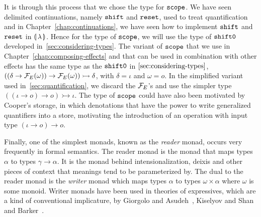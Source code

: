 It is through this process that we chose the type for $\mathtt{scope}$. We have
seen delimited continuations, namely $\mathtt{shift}$ and $\mathtt{reset}$, used to treat
quantification~\cite{shan2004delimited,shan2005linguistic} and in
Chapter~\ref{chap:continuations}, we have seen how to implement $\mathtt{shift}$
and $\mathtt{reset}$ in $\llparenthesis \, \lambda \, \rrparenthesis$. Hence for the type of $\mathtt{scope}$, we
will use the type of $\mathtt{shift0}$ developed
in~\ref{sec:considering-types}. The variant of $\mathtt{scope}$ that we use in
Chapter~\ref{chap:composing-effects} and that can be used in combination
with other effects has the same type as the $\mathtt{shift0}$ in
$\ref{sec:considering-types}$,
$((\delta \to \mathcal{F}_E(\omega)) \to \mathcal{F}_E(\omega)) \rightarrowtail \delta$,
with $\delta = \iota$ and $\omega = o$. In the simplified variant used
in~\ref{sec:quantification}, we discard the $\mathcal{F}_E$'s and use the simpler
type $((\iota \to o) \to o) \rightarrowtail \iota$. The type of
$\mathtt{scope}$ could have also been motivated by Cooper's storage, in which
denotations that have the power to write generalized quantifiers into a
store, motivating the introduction of an operation with input type
$(\iota \to o) \to o$.

Finally, one of the simplest monads, known as the \emph{reader} monad,
occurs very frequently in formal semantics. The reader monad is the monad
that maps types $\alpha$ to types $\gamma \to \alpha$. It is the monad
behind intensionalization, deixis and other pieces of context that meanings
tend to be parameterized by. The dual to the reader monad is the
\emph{writer} monad which maps types $\alpha$ to types
$\omega \times \alpha$ where $\omega$ is some monoid. Writer monads have
been used in theories of expressives, which are a kind of conventional
implicature, by Giorgolo and
Asudeh~\cite{giorgolo2011multidimensional,giorgolo2012monads}, Kiselyov and
Shan~\cite{kiselyov2010lambda} and Barker~\cite{barker2015monads}.

